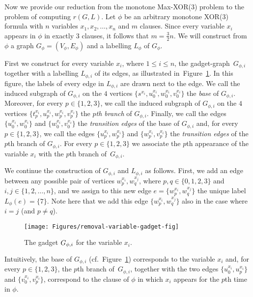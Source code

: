 \documentclass[a4paper,UKenglish]{article}
\begin{document}
Now we provide our reduction from the monotone Max-XOR($3$) problem to the
problem of computing $r(G,L )$. Let $\phi $ be an arbitrary monotone XOR($3$) formula 
with $n$ variables $x_{1},x_{2},\ldots,x_{n}$ and $m$ clauses. 
Since every variable $x_{i}$ appears in $\phi $ in
exactly $3$ clauses, it follows that $m=\frac{3}{2}n$. We will construct
from $\phi $ a graph $G_{\phi }=(V_{\phi },E_{\phi })$ and a
labelling $L _{\phi }$ of $G_{\phi }$. 


First we construct for every variable $x_{i}$, where $1\leq i \leq n$, 
the gadget-graph~$G_{\phi,i}$ together with a labelling $L _{\phi ,i}$ of its edges, 
as illustrated in~Figure~\ref{removal-variable-gadget-fig}. 
In this figure, the labels of every edge in $L _{\phi ,i}$ are drawn next to the edge. 
We call the induced subgraph of $G_{\phi ,i}$ on the $4$ vertices $\{s^{x_{i}},u_{0}^{x_{i}},w_{0}^{x_{i}},v_{0}^{x_{i}}\}$ the \emph{base} of $G_{\phi ,i}$. Moreover, for every $p\in \{1,2,3\}$, we call the induced
subgraph of $G_{\phi ,i}$ on the $4$ vertices $\{t_{p}^{x_{i}},u_{p}^{x_{i}},w_{p}^{x_{i}},v_{p}^{x_{i}}\}$ the $p$\emph{th
branch} of $G_{\phi ,i}$. Finally, we call the edges $\{  u_{0}^{x_{i}} , w_{0}^{x_{i}}  \}$ and $ \{   w_{0}^{x_{i}} ,  v_{0}^{x_{i}} \}$ the \emph{transition edges} of the base of $G_{\phi ,i}$ and, for every $p\in
\{1,2,3\} $, we call the edges $  \{  u_{p}^{x_{i}} , w_{p}^{x_{i}}  \}$ and $\{  w_{p}^{x_{i}}  ,  v_{p}^{x_{i}}  \}$ the \emph{transition edges} of the $p$th branch of $G_{\phi ,i}$. 
For every $p\in \{1,2,3\}$ we associate the $p$th appearance of the variable $x_{i}$  with the $p$th
branch of~$G_{\phi ,i}$.


We continue the construction of $G_{\phi ,i}$ and $L _{\phi ,i}$ as
follows. First, we add an edge between any possible pair of vertices $w_{p}^{x_{i}},w_{q}^{x_{j}}$, where $p,q\in \{0,1,2,3\}$ and $i,j\in
\{1,2,\ldots ,n\}$, and we assign to this new edge $e=  \{  w_{p}^{x_{i}}  ,  w_{q}^{x_{j}}  \} $ the unique label~$L _{\phi }(e)=\{7\}$.
Note here that we add this edge $ \{ w_{p}^{x_{i}}  , w_{q}^{x_{j}}  \}$ also in the
case where $i=j$ (and $p\neq q$). 


\begin{figure}[tbh]
\centering\texttt{[image: Figures/removal-variable-gadget-fig]}
\caption{The gadget $G_{\protect\phi ,i}$ for the variable $x_{i}$.}
\label{removal-variable-gadget-fig}
\end{figure}



Intuitively, the base of $G_{\phi,i}$ (cf.~Figure~\ref{removal-variable-gadget-fig}) 
corresponds to the variable $x_{i}$ and, 
for every $p\in\{1,2,3\}$, the $p$th branch of~$G_{\phi,i}$, together with the two edges $\{u_{0}^{x_{i}},u_{p}^{x_{i}}\}$ and $\{v_{0}^{x_{i}},v_{p}^{x_{i}}\}$, 
correspond to the clause of $\phi$ in which $x_{i}$ appears for the $p$th time in $\phi$.
\end{document}
